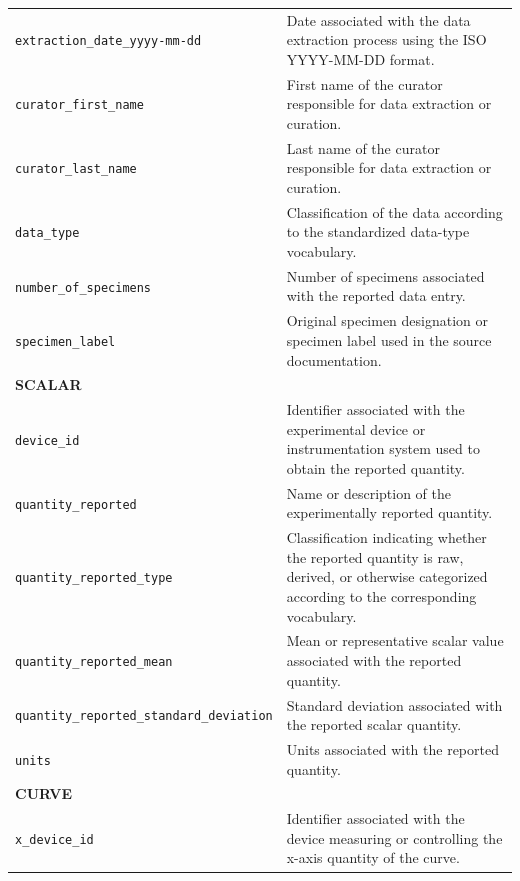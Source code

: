 \documentclass[11pt]{book}
\begin{document}
{\begin{longtable}{p{}p{}}
\texttt{extraction\_date\_yyyy-mm-dd} &
Date associated with the data extraction process using the ISO YYYY-MM-DD format. \\

\texttt{curator\_first\_name} &
First name of the curator responsible for data extraction or curation. \\

\texttt{curator\_last\_name} &
Last name of the curator responsible for data extraction or curation. \\

\texttt{data\_type} &
Classification of the data according to the standardized data-type vocabulary. \\

\texttt{number\_of\_specimens} &
Number of specimens associated with the reported data entry. \\

\texttt{specimen\_label} &
Original specimen designation or specimen label used in the source documentation. \\

\hline
\multicolumn{2}{l}{\textbf{SCALAR}}\\
\hline

\texttt{device\_id} &
Identifier associated with the experimental device or instrumentation system used to obtain the reported quantity. \\

\texttt{quantity\_reported} &
Name or description of the experimentally reported quantity. \\

\texttt{quantity\_reported\_type} &
Classification indicating whether the reported quantity is raw, derived, or otherwise categorized according to the corresponding vocabulary. \\

\texttt{quantity\_reported\_mean} &
Mean or representative scalar value associated with the reported quantity. \\

\texttt{quantity\_reported\_standard\_deviation} &
Standard deviation associated with the reported scalar quantity. \\

\texttt{units} &
Units associated with the reported quantity. \\

\hline
\multicolumn{2}{l}{\textbf{CURVE}}\\
\hline

\texttt{x\_device\_id} &
Identifier associated with the device measuring or controlling the x-axis quantity of the curve. \\


\end{longtable}}
\end{document}
